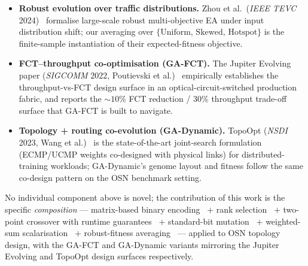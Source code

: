 \documentclass{article}
\begin{document}
\begin{itemize}
        \item \textbf{Robust evolution over traffic distributions.}  Zhou et al.\ (\emph{IEEE TEVC} 2024)~\cite{zhou2024robust} formalise large-scale robust multi-objective EA under input distribution shift; our averaging over $\{\text{Uniform, Skewed, Hotspot}\}$ is the finite-sample instantiation of their expected-fitness objective.
        \item \textbf{FCT--throughput co-optimisation (GA-FCT).}  The Jupiter Evolving paper (\emph{SIGCOMM} 2022, Poutievski et al.)~\cite{poutievski2022jupiter} empirically establishes the throughput-vs-FCT design surface in an optical-circuit-switched production fabric, and reports the $\sim 10\%$ FCT reduction / $30\%$ throughput trade-off surface that GA-FCT is built to navigate.
        \item \textbf{Topology + routing co-evolution (GA-Dynamic).}  TopoOpt (\emph{NSDI} 2023, Wang et al.)~\cite{wang2023topoopt} is the state-of-the-art joint-search formulation (ECMP/UCMP weights co-designed with physical links) for distributed-training workloads; GA-Dynamic's genome layout and fitness follow the same co-design pattern on the OSN benchmark setting.
    \end{itemize}
    No individual component above is novel; the contribution of this work is the specific \emph{composition} --- matrix-based binary encoding~\cite{stanovov2024matrix} $+$ rank selection~\cite{kumar2021rank} $+$ two-point crossover with runtime guarantees~\cite{antipov2022fast} $+$ standard-bit mutation~\cite{doerr2020theory} $+$ weighted-sum scalarisation~\cite{blank2021running} $+$ robust-fitness averaging~\cite{zhou2024robust} --- applied to OSN topology design, with the GA-FCT and GA-Dynamic variants mirroring the Jupiter Evolving and TopoOpt design surfaces respectively.
\end{document}
